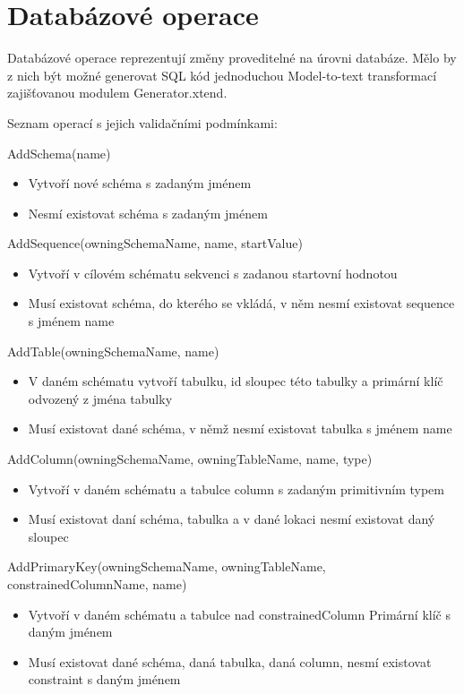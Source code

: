 \documentclass[11pt,twoside,a4paper]{book}
\begin{document}
\section{Databázové operace}
Databázové operace reprezentují změny proveditelné na úrovni databáze. Mělo by z
nich být možné generovat SQL kód jednoduchou Model-to-text transformací
zajišťovanou modulem Generator.xtend.


Seznam operací s jejich validačními podmínkami:
\begin{list}{Operace :}{}
  \item AddSchema(name)
  \begin{itemize}
    \item Vytvoří nové schéma s zadaným jménem
    \item Nesmí existovat schéma s zadaným
    jménem
  \end{itemize}
  
  \item AddSequence(owningSchemaName, name, startValue)
  \begin{itemize}
    \item Vytvoří v cílovém schématu sekvenci s zadanou startovní hodnotou
    \item Musí existovat schéma, do kterého se vkládá, v něm nesmí existovat
    sequence s jménem name
  \end{itemize}
  
  \item AddTable(owningSchemaName, name)
  \begin{itemize}
    \item V daném schématu vytvoří tabulku, id sloupec této tabulky a primární
    klíč odvozený z jména tabulky
    \item Musí existovat dané schéma, v
    němž nesmí existovat tabulka s jménem name
  \end{itemize}
  
  \item AddColumn(owningSchemaName, owningTableName, name, type)
  \begin{itemize}
    \item Vytvoří v daném schématu a tabulce column s zadaným primitivním typem
    \item Musí existovat daní schéma, tabulka a v dané lokaci nesmí existovat
    daný sloupec
  \end{itemize}
  
  \item AddPrimaryKey(owningSchemaName, owningTableName,
  constrainedColumnName, name)
  \begin{itemize}
    \item Vytvoří v daném schématu a tabulce nad constrainedColumn Primární klíč
    s daným jménem
    \item Musí existovat dané schéma, daná tabulka, daná column, nesmí existovat
    constraint s daným jménem
  \end{itemize}


\end{list}
\end{document}
